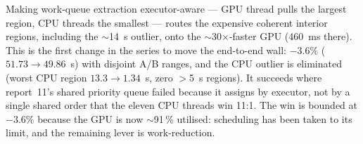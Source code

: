 \documentclass[
	english,
	letterpaper, oneside
]{article}
\begin{document}
Making work-queue extraction executor-aware --- GPU thread pulls the largest
region, CPU threads the smallest --- routes the expensive coherent interior
regions, including the $\sim$14~s outlier, onto the $\sim$30$\times$-faster GPU
(460~ms there). This is the first change in the series to move the end-to-end
wall: $-3.6\%$ ($51.73\to49.86$~s) with disjoint A/B ranges, and the CPU outlier
is eliminated (worst CPU region $13.3\to1.34$~s, zero $>$5~s regions). It
succeeds where report~11's shared priority queue failed because it assigns by
executor, not by a single shared order that the eleven CPU threads win
11:1. The win is bounded at $-3.6\%$ because the GPU is now $\sim$91\,\% utilised:
scheduling has been taken to its limit, and the remaining lever is work-reduction.
\end{document}
